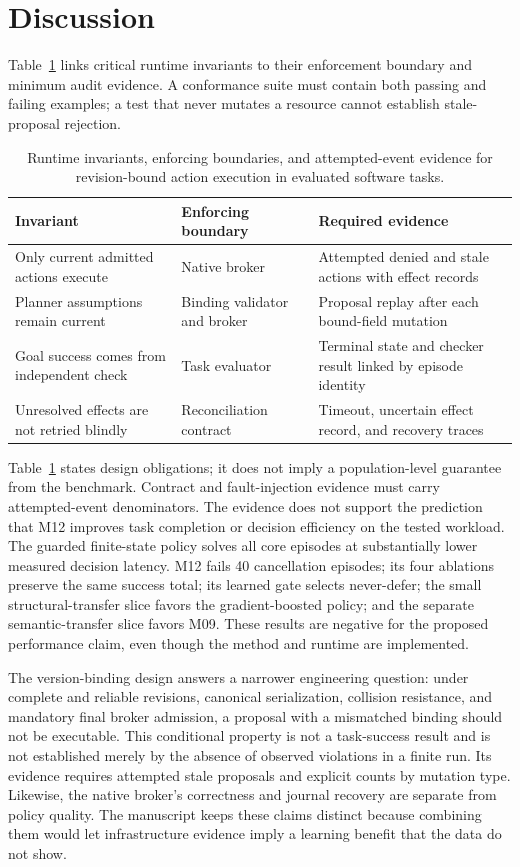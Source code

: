 \documentclass[11pt]{article}
\begin{document}
\section{Discussion}
Table~\ref{tab:invariants} links critical runtime invariants to their enforcement boundary and minimum audit evidence. A conformance suite must contain both passing and failing examples; a test that never mutates a resource cannot establish stale-proposal rejection.
\begin{table}[ht]
\centering\small
\caption{Runtime invariants, enforcing boundaries, and attempted-event evidence for revision-bound action execution in evaluated software tasks.}
\label{tab:invariants}
\begin{tabular}{p{.29\linewidth}p{.23\linewidth}p{.34\linewidth}}\toprule
Invariant & Enforcing boundary & Required evidence \\\midrule
Only current admitted actions execute & Native broker & Attempted denied and stale actions with effect records \\
Planner assumptions remain current & Binding validator and broker & Proposal replay after each bound-field mutation \\
Goal success comes from independent check & Task evaluator & Terminal state and checker result linked by episode identity \\
Unresolved effects are not retried blindly & Reconciliation contract & Timeout, uncertain effect record, and recovery traces \\\bottomrule
\end{tabular}
\end{table}
Table~\ref{tab:invariants} states design obligations; it does not imply a population-level guarantee from the benchmark. Contract and fault-injection evidence must carry attempted-event denominators.
The evidence does not support the prediction that M12 improves task completion or decision efficiency on the tested workload. The guarded finite-state policy solves all core episodes at substantially lower measured decision latency. M12 fails 40 cancellation episodes; its four ablations preserve the same success total; its learned gate selects never-defer; the small structural-transfer slice favors the gradient-boosted policy; and the separate semantic-transfer slice favors M09. These results are negative for the proposed performance claim, even though the method and runtime are implemented.

The version-binding design answers a narrower engineering question: under complete and reliable revisions, canonical serialization, collision resistance, and mandatory final broker admission, a proposal with a mismatched binding should not be executable. This conditional property is not a task-success result and is not established merely by the absence of observed violations in a finite run. Its evidence requires attempted stale proposals and explicit counts by mutation type. Likewise, the native broker's correctness and journal recovery are separate from policy quality. The manuscript keeps these claims distinct because combining them would let infrastructure evidence imply a learning benefit that the data do not show.
\end{document}
